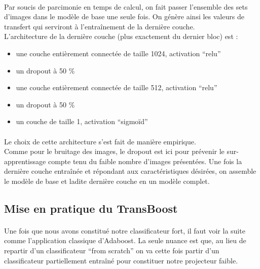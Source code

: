 \documentclass[11 pt]{article}
\begin{document}
\paragraph{}Par soucis de parcimonie en temps de calcul, on fait passer l’ensemble des sets d’images dans le modèle de base une seule fois. On génère ainsi les valeurs de transfert qui serviront à l’entraînement de la dernière couche. \\
L’architecture de la dernière couche (plus exactement du dernier bloc) est :\\ \medskip
\begin{samepage}
  \begin{itemize}
    \item une couche entièrement connectée de taille 1024, activation “relu”
    \nopagebreak
    \item un dropout à 50 \%
    \nopagebreak
    \item une couche entièrement connectée de taille 512, activation “relu”
    \nopagebreak
    \item un dropout à 50 \%
    \nopagebreak
    \item un couche de taille 1, activation “sigmoïd”
  \end{itemize}
\end{samepage}

\medskip

\paragraph{}Le choix de cette architecture s’est fait de manière empirique.\\

Comme pour le bruitage des images, le dropout est ici pour prévenir le sur-apprentissage compte tenu du faible nombre d’images présentées.
Une fois la dernière couche entraînée et répondant aux caractéristiques désirées, on assemble le modèle de base et ladite dernière couche en un modèle complet.


\subsection{Mise en pratique du TransBoost}
\paragraph{}Une fois que nous avons constitué notre classificateur fort, il faut voir la suite comme l’application classique d’Adaboost. La seule nuance est que, au lieu de repartir d’un classificateur “from scratch” on va cette fois partir d’un classificateur partiellement entraîné pour constituer notre projecteur faible.
\end{document}
